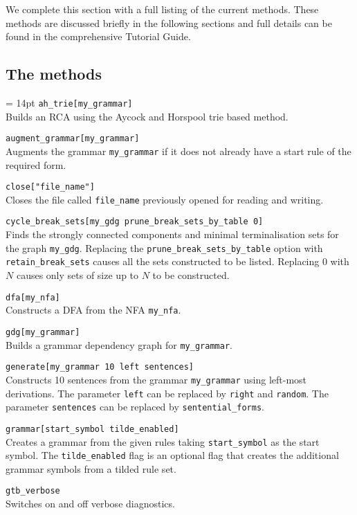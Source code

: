 We complete this section with a full listing of the current \gtb methods.
These methods are discussed briefly in the following sections
and full details can be found in the comprehensive Tutorial Guide.

\subsection{The \gtb methods}
{\parindent=0pt
\parskip = 14pt
\verb+ah_trie[my_grammar]+ \\
Builds an RCA using the Aycock and Horspool trie based method.

\verb+augment_grammar[my_grammar]+ \\
Augments the grammar \verb+my_grammar+ if it does not already have a 
start rule of the required form. 

\verb+close["file_name"]+ \\
Closes the file called \verb+file_name+ previously opened
for reading and writing.

\verb+cycle_break_sets[my_gdg prune_break_sets_by_table 0]+ \\
Finds the strongly connected components and minimal terminalisation
sets for the graph \verb+my_gdg+. Replacing the
\verb+prune_break_sets_by_table+ option with \verb+retain_break_sets+
causes all the sets constructed to be listed. Replacing 0 with $N$
causes only sets of size up to $N$ to be constructed.

\verb+dfa[my_nfa]+\\
Constructs a DFA from the NFA \verb+my_nfa+.

\verb+gdg[my_grammar]+ \\
Builds a grammar dependency graph for \verb+my_grammar+.

\verb+generate[my_grammar 10 left sentences]+ \\
Constructs 10 sentences from the grammar \verb+my_grammar+ using 
left-most derivations. The parameter \verb+left+ can be replaced by 
\verb+right+ and \verb+random+. The parameter \verb+sentences+ can be 
replaced by \verb+sentential_forms+.

\verb+grammar[start_symbol tilde_enabled]+ \\
Creates a grammar from the given rules
taking \verb+start_symbol+ as the start symbol.
The \verb+tilde_enabled+ flag is an optional flag that creates the
additional grammar symbols from a tilded rule set.

\verb+gtb_verbose+ \\
Switches on and off verbose diagnostics.

}
